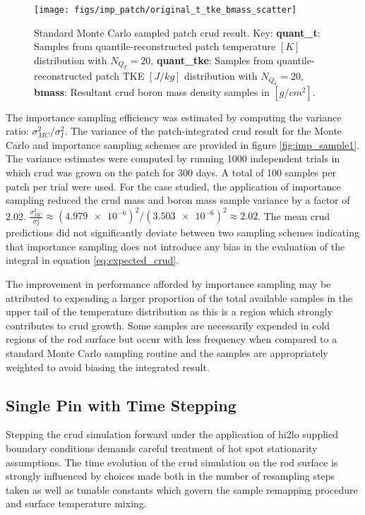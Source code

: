\begin{figure}[H]
    \centering
    \texttt{[image: figs/imp\_patch/original\_t\_tke\_bmass\_scatter]}
    \caption[Standard Monte Carlo sampled patch crud result.]{Standard Monte Carlo sampled patch crud result. Key: \textbf{quant\_t}: Samples from quantile-reconstructed patch temperature $[K]$ distribution with $N_{Q_T}=20$,  \textbf{quant\_tke}: Samples from quantile-reconstructed patch TKE $[J/kg]$ distribution with $N_{Q_k}=20$,  \textbf{bmass}: Resultant crud boron mass density samples in $[g/cm^2]$.  }
    \label{fig:originalttkebmassscatter}
\end{figure}

The importance sampling efficiency was estimated by computing the variance ratio:  $\sigma^2_{MC}/\sigma^2_{I}$.  The variance of the patch-integrated crud result for the Monte Carlo and importance sampling schemes are provided in figure \ref{fig:imp_sample1}.  The variance estimates were computed by running 1000 independent trials in which crud was grown on the patch for 300 days.  A total of 100 samples per patch per trial were used.  For the case studied, the application of importance sampling reduced the crud mass and boron mass sample variance by a factor of 2.02. $\frac{\sigma^2_{MC}}{\sigma^2_{I}} \approx (\num{4.979e-6})^2 / (\num{3.503e-6})^2  \approx 2.02$.  The mean crud predictions did not significantly deviate between two sampling schemes indicating that importance sampling does not introduce any bias in the evaluation of the integral in equation \ref{eq:expected_crud}.

The improvement in performance afforded by importance sampling may be attributed to expending a larger proportion of the total available samples in the upper tail of the temperature distribution as this is a region which strongly contributes to crud growth.  Some samples are necessarily expended in cold regions of the rod surface but occur with less frequency when compared to a standard Monte Carlo sampling routine and the samples are appropriately weighted to avoid biasing the integrated result.


\subsection{Single Pin with Time Stepping}

Stepping the crud simulation forward under the application of hi2lo supplied boundary conditions demands careful treatment of hot spot stationarity assumptions.  The time evolution of the crud simulation on the rod surface is strongly influenced by choices made both in the number of resampling steps taken as well as tunable constants which govern the sample remapping procedure and surface temperature mixing.

